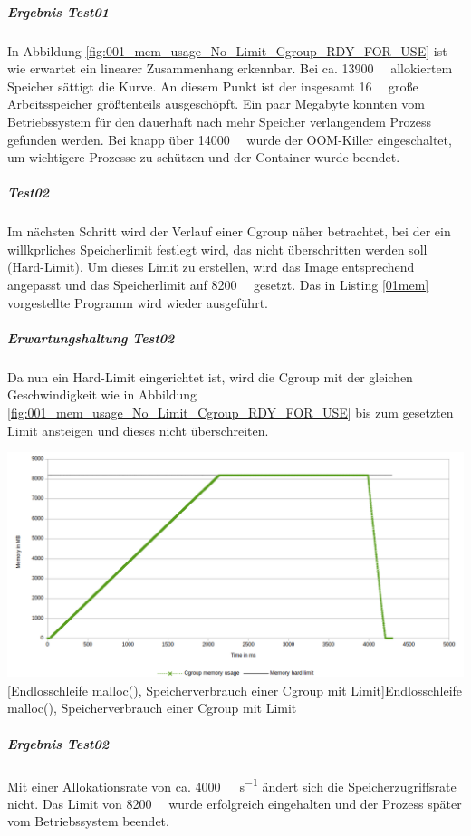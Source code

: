 \subparagraph{Ergebnis Test01}
In Abbildung \ref{fig:001_mem_usage_No_Limit_Cgroup_RDY_FOR_USE} ist wie erwartet ein linearer Zusammenhang erkennbar. Bei ca. \SI{13900}{\mega\byte} allokiertem Speicher sättigt die Kurve. An diesem Punkt ist der insgesamt \SI{16}{\giga\byte} große Arbeitsspeicher größtenteils ausgeschöpft. Ein paar Megabyte konnten vom Betriebssystem für den dauerhaft nach mehr Speicher verlangendem Prozess gefunden werden. Bei knapp über \SI{14000}{\mega\byte} wurde der OOM-Killer eingeschaltet, um wichtigere Prozesse zu schützen und der Container wurde beendet.

\subparagraph{Test02}
Im nächsten Schritt wird der Verlauf einer Cgroup näher betrachtet, bei der ein willkprliches Speicherlimit festlegt wird, das nicht überschritten werden soll (Hard-Limit). Um dieses Limit zu erstellen, wird das Image entsprechend angepasst und das Speicherlimit auf \SI{8200}{\mega\byte} gesetzt. Das in Listing \ref{01mem} vorgestellte Programm wird wieder ausgeführt.

\subparagraph{Erwartungshaltung Test02}
Da nun ein Hard-Limit eingerichtet ist, wird die Cgroup mit der gleichen Geschwindigkeit wie in Abbildung \ref{fig:001_mem_usage_No_Limit_Cgroup_RDY_FOR_USE} bis zum gesetzten Limit ansteigen und dieses nicht überschreiten. 

\vspace{1em}
\begin{minipage}{\linewidth}
	\centering
	\includegraphics[width=1\linewidth]{pics/002_mem_usage_8200mb_limit_Cgroup_RDY_FOR_USE.png}
	[Endlosschleife malloc(), Speicherverbrauch einer Cgroup mit Limit]{Endlosschleife malloc(), Speicherverbrauch einer Cgroup mit Limit}
	\label{fig:002_mem_usage_8200mb_limit_Cgroup_RDY_FOR_USE}
\end{minipage}

\subparagraph{Ergebnis Test02}
Mit einer Allokationsrate von ca. \SI{4000}{\mega\byte\per\second} ändert sich die Speicherzugriffsrate nicht. Das Limit von \SI{8200}{\mega\byte} wurde erfolgreich eingehalten und der Prozess später vom Betriebssystem beendet.

